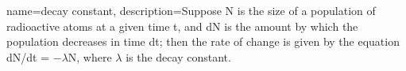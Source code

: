 {
    name=decay constant,
    description={Suppose N is the size of a population of radioactive atoms at a given time t, and dN is the amount by which the population decreases in time dt; then the rate of change is given by the equation dN/dt = −$\lambda$N, where $\lambda$ is the decay constant.}
}

